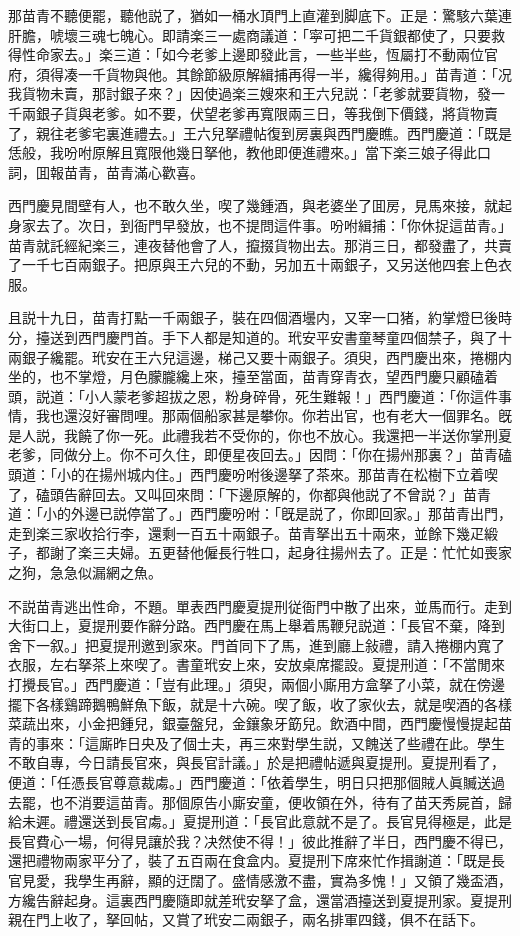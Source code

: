 那苗青不聽便罷，聽他説了，猶如一桶水頂門上直灌到脚底下。正是：驚駭六葉連肝膽，唬壞三魂七魄心。即請楽三一處商議道：「寜可把二千貨銀都使了，只要救得性命家去。」楽三道：「如今老爹上邊即發此言，一些半些，恆屬打不動兩位官府，須得凑一千貨物與他。其餘節級原解緝捕再得一半，纔得夠用。」苗青道：「况我貨物未賣，那討銀子來？」因使過楽三嫂來和王六兒説：「老爹就要貨物，發一千兩銀子貨與老爹。如不要，伏望老爹再寬限兩三日，等我倒下價錢，將貨物賣了，親往老爹宅裏進禮去。」王六兒拏禮帖復到房裏與西門慶瞧。西門慶道：「既是恁般，我吩咐原解且寬限他幾日拏他，教他即便進禮來。」當下楽三娘子得此口詞，囬報苗青，苗青滿心歡喜。

西門慶見間壁有人，也不敢久坐，喫了幾鍾酒，與老婆坐了囬房，見馬來接，就起身家去了。次日，到衙門早發放，也不提問這件事。吩咐緝捕：「你休捉這苗青。」苗青就託經紀楽三，連夜替他會了人，攛掇貨物出去。那消三日，都發盡了，共賣了一千七百兩銀子。把原與王六兒的不動，另加五十兩銀子，又另送他四套上色衣服。

且説十九日，苗青打點一千兩銀子，裝在四個酒壜内，又宰一口猪，約掌燈巳後時分，擡送到西門慶門首。手下人都是知道的。玳安平安書童琴童四個禁子，與了十兩銀子纔罷。玳安在王六兒這邊，梯己又要十兩銀子。須臾，西門慶出來，捲棚内坐的，也不掌燈，月色朦朧纔上來，擡至當面，苗青穿青衣，望西門慶只顧磕着頭，説道：「小人蒙老爹超拔之恩，粉身碎骨，死生難報！」西門慶道：「你這件事情，我也還沒好審問哩。那兩個船家甚是攀你。你若出官，也有老大一個罪名。旣是人説，我饒了你一死。此禮我若不受你的，你也不放心。我還把一半送你掌刑夏老爹，同做分上。你不可久住，即便星夜回去。」因問：「你在揚州那裏？」苗青磕頭道：「小的在揚州城内住。」西門慶吩咐後邊拏了茶來。那苗青在松樹下立着喫了，磕頭告辭回去。又叫回來問：「下邊原解的，你都與他説了不曾説？」苗青道：「小的外邊已説停當了。」西門慶吩咐：「旣是説了，你即回家。」那苗青出門，走到楽三家收拾行李，還剩一百五十兩銀子。苗青拏出五十兩來，並餘下幾疋緞子，都謝了楽三夫婦。五更替他僱長行牲口，起身往揚州去了。正是：忙忙如喪家之狗，急急似漏網之魚。

不説苗青逃出性命，不題。單表西門慶夏提刑従衙門中散了出來，並馬而行。走到大街口上，夏提刑要作辭分路。西門慶在馬上舉着馬鞭兒説道：「長官不棄，降到舍下一叙。」把夏提刑邀到家來。門首同下了馬，進到廳上敍禮，請入捲棚内寬了衣服，左右拏茶上來喫了。書童玳安上來，安放桌席擺設。夏提刑道：「不當閒來打攪長官。」西門慶道：「豈有此理。」須臾，兩個小廝用方盒拏了小菜，就在傍邊擺下各樣鷄蹄鵝鴨鮮魚下飯，就是十六碗。喫了飯，收了家伙去，就是喫酒的各樣菜蔬出來，小金把鍾兒，銀臺盤兒，金鑲象牙筯兒。飲酒中間，西門慶慢慢提起苗青的事來：「這廝昨日央及了個士夫，再三來對學生説，又餽送了些禮在此。學生不敢自專，今日請長官來，與長官計議。」於是把禮帖遞與夏提刑。夏提刑看了，便道：「任憑長官尊意裁䖏。」西門慶道：「依着學生，明日只把那個賊人眞贓送過去罷，也不消要這苗青。那個原告小廝安童，便收領在外，待有了苗天秀屍首，歸給未遲。禮還送到長官䖏。」夏提刑道：「長官此意就不是了。長官見得極是，此是長官費心一場，何得見讓於我？决然使不得！」彼此推辭了半日，西門慶不得已，還把禮物兩家平分了，裝了五百兩在食盒内。夏提刑下席來忙作揖謝道：「既是長官見愛，我學生再辭，顯的迂闊了。盛情感激不盡，實為多愧！」又領了幾盃酒，方纔告辭起身。這裏西門慶隨即就差玳安拏了盒，還當酒擡送到夏提刑家。夏提刑親在門上收了，拏回帖，又賞了玳安二兩銀子，兩名排軍四錢，俱不在話下。


